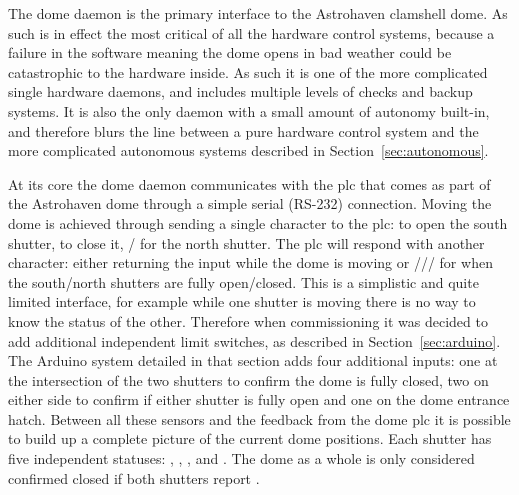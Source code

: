 \begin{colsection}
\begin{colsection}
The dome daemon is the primary interface to the Astrohaven clamshell dome. As such is in effect the most critical of all the hardware control systems, because a failure in the software meaning the dome opens in bad weather could be catastrophic to the hardware inside. As such it is one of the more complicated single hardware daemons, and includes multiple levels of checks and backup systems. It is also the only daemon with a small amount of autonomy built-in, and therefore blurs the line between a pure hardware control system and the more complicated autonomous systems described in Section~\ref{sec:autonomous}.

At its core the dome daemon communicates with the \gls{plc} that comes as part of the Astrohaven dome through a simple serial (RS-232) connection. Moving the dome is achieved through sending a single character to the \gls{plc}:  to open the south shutter,  to close it, / for the north shutter. The \gls{plc} will respond with another character: either returning the input while the dome is moving or /// for when the south/north shutters are fully open/closed. This is a simplistic and quite limited interface, for example while one shutter is moving there is no way to know the status of the other. Therefore when commissioning it was decided to add additional independent limit switches, as described in Section~\ref{sec:arduino}. The Arduino system detailed in that section adds four additional inputs: one at the intersection of the two shutters to confirm the dome is fully closed, two on either side to confirm if either shutter is fully open and one on the dome entrance hatch. Between all these sensors and the feedback from the dome \gls{plc} it is possible to build up a complete picture of the current dome positions. Each shutter has five independent statuses: , , ,  and . The dome as a whole is only considered confirmed closed if both shutters report .


\end{colsection}
\end{colsection}

